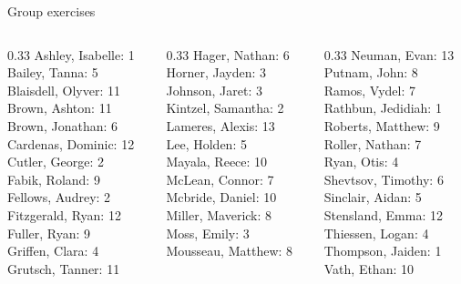 \documentclass[10pt]{beamer}
\begin{document}
\begin{frame}[standout]
Group exercises
\end{frame}

\begin{frame}
\begin{columns}
\begin{column}{0.33\textwidth}
Ashley, Isabelle: 1 \\ 
Bailey, Tanna: 5 \\ 
Blaisdell, Olyver: 11 \\ 
Brown, Ashton: 11 \\ 
Brown, Jonathan: 6 \\ 
Cardenas, Dominic: 12 \\ 
Cutler, George: 2 \\ 
Fabik, Roland: 9 \\ 
Fellows, Audrey: 2 \\ 
Fitzgerald, Ryan: 12 \\ 
Fuller, Ryan: 9 \\ 
Griffen, Clara: 4 \\ 
Grutsch, Tanner: 11 \\\end{column}
\begin{column}{0.33\textwidth}
Hager, Nathan: 6 \\ 
Horner, Jayden: 3 \\ 
Johnson, Jaret: 3 \\ 
Kintzel, Samantha: 2 \\ 
Lameres, Alexis: 13 \\ 
Lee, Holden: 5 \\ 
Mayala, Reece: 10 \\ 
McLean, Connor: 7 \\ 
Mcbride, Daniel: 10 \\ 
Miller, Maverick: 8 \\ 
Moss, Emily: 3 \\ 
Mousseau, Matthew: 8 \\\end{column}
\begin{column}{0.33\textwidth}
Neuman, Evan: 13 \\ 
Putnam, John: 8 \\ 
Ramos, Vydel: 7 \\ 
Rathbun, Jedidiah: 1 \\ 
Roberts, Matthew: 9 \\ 
Roller, Nathan: 7 \\ 
Ryan, Otis: 4 \\ 
Shevtsov, Timothy: 6 \\ 
Sinclair, Aidan: 5 \\ 
Stensland, Emma: 12 \\ 
Thiessen, Logan: 4 \\ 
Thompson, Jaiden: 1 \\ 
Vath, Ethan: 10 \\\end{column}
\end{columns}
\end{frame}
\end{document}

